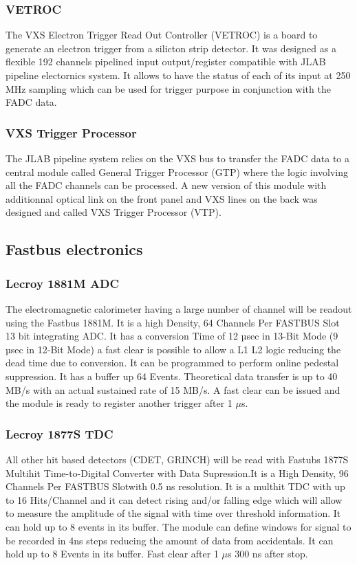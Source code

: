 \documentclass{article}
\begin{document}
\subsubsection{VETROC}
The VXS Electron Trigger Read Out Controller (VETROC) is a board to generate an electron trigger from a silicton strip detector. It was designed as a flexible 192 channels pipelined input output/register compatible with JLAB pipeline electornics system. It allows to have the status of each of its input at 250 MHz sampling which can be used for trigger purpose in conjunction with the FADC data.

\subsubsection{VXS Trigger Processor}
The JLAB pipeline system relies on the VXS bus to transfer the FADC data to a central module called General Trigger Processor (GTP) where the logic involving all the FADC channels can be processed. A new version of this module with additionnal optical link on the front panel and VXS lines on the back was designed and called VXS Trigger Processor (VTP).


\subsection{Fastbus electronics}
\subsubsection{Lecroy 1881M ADC}
The electromagnetic calorimeter having a large number of channel will be readout using the Fastbus 1881M.
It is a high Density, 64 Channels Per FASTBUS Slot 13 bit integrating ADC. It has a conversion Time of 12 µsec in 13-Bit Mode (9 µsec in 12-Bit Mode) a fast clear is possible to allow a L1 L2 logic reducing the dead time due to conversion. It can be programmed to perform online pedestal suppression. It has a buffer up 64 Events.
Theoretical data transfer is up to 40 MB/s with an actual sustained rate of 15 MB/s.
A fast clear can be issued and the module is ready to register another trigger after 1 $\mu$s.

\subsubsection{Lecroy 1877S TDC}
All other hit based detectors (CDET, GRINCH) will be read with Fastubs 1877S Multihit Time-to-Digital Converter with Data Supression.It is a  High Density, 96 Channels Per FASTBUS Slotwith 0.5 ns resolution.
It is a multhit TDC with up to 16 Hits/Channel and it can detect rising and/or falling edge which will allow to measure the amplitude of the signal with time over threshold information. It can hold up to 8 events in its buffer. The module can define windows for signal to be recorded in 4ns steps reducing the amount of data from accidentals. It can hold up to 8 Events in its buffer.
    Fast clear after 1 $\mu$s 300 ns after stop.
\end{document}
